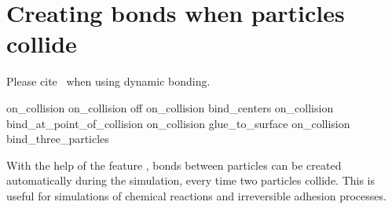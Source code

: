 \section{Creating bonds when particles collide}

\begin{citebox}
  Please cite~ when using dynamic bonding.
\end{citebox}


\begin{essyntax}
 on\_collision
 on\_collision off
 on\_collision  bind_centers  
 on\_collision  bind_at_point_of_collision    
 on\_collision  glue_to_surface        
 on\_collision  bind_three_particles    
\end{essyntax}

With the help of the feature , bonds
between particles can be created automatically during the simulation,
every time two particles collide. This is useful for simulations of
chemical reactions and irreversible adhesion processes.

